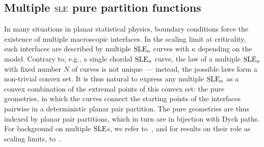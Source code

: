 \documentclass[oneside,english]{amsart}
\numberwithin{equation}{section}
\numberwithin{figure}{section}
\theoremstyle{plain}
\theoremstyle{plain}
\newtheorem{thm}{\protect\theoremname}%
\theoremstyle{plain}
\theoremstyle{remark}
\theoremstyle{plain}
\theoremstyle{plain}
\theoremstyle{plain}
\theoremstyle{plain}
\theoremstyle{plain}
\theoremstyle{plain}
\theoremstyle{plain}
\theoremstyle{plain}
\providecommand{\theoremname}{Theorem}
\newcommand{\blue}[1]{{\color{blue} #1}}
\begin{document}






\subsection{Multiple $\mathrm{SLE}$ pure partition functions}
\label{sub: pure partition functions}
In many situations in planar statistical physics, boundary conditions force the
existence of multiple macroscopic interfaces. In the scaling limit at criticality, such
interfaces are described by multiple $\mathrm{SLE}_{\kappa}$ curves %
with $\kappa$ depending on the model. Contrary to, e.g., a single chordal $\mathrm{SLE}_{\kappa}$ curve,
the law of a multiple $\mathrm{SLE}_{\kappa}$ with fixed %
number $N$ of curves
is not unique~--- instead, the possible laws form a non-trivial convex set.
It is thus natural to express any multiple $\mathrm{SLE}_{\kappa}$ as a convex combination of
the extremal points of this convex set: the pure geometries,
in which the curves connect the starting points of the interfaces  
pairwise in a deterministic planar pair partition. 
The pure geometries are thus
indexed by planar pair partitions, which in turn are in bijection with Dyck paths.
For background on multiple $\mathrm{SLE}$s, we refer 
to~\cite{BBK-multiple_SLEs,Dubedat-commutation,LK-configurational_measure,KP-pure_partition_functions_of_multiple_SLEs},
and for results on their role as scaling limits,
to~\cite{CS-universality_in_2d_Ising, Izyurov-critical_Ising_interfaces_in_multiply_connected_domains,
KKP-boundary_correlations_in_planar_LERW_and_UST,
PH-Global_multiple_SLEs_and_pure_partition_functions, Wu-convergence_of_Ising_interfaces_to_hypergeometric_SLE,
Beffara_Peltola_Wu-Uniqueness_of_global_multiple_SLEs, KS-configurations_of_FK_interfaces}.
\end{document}
